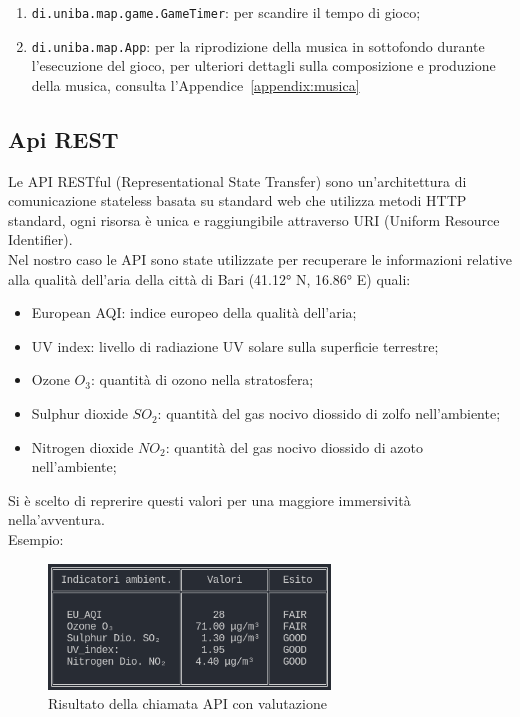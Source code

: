 \documentclass[italian,12pt,a4paper]{article}
\begin{document}
	\begin{enumerate}
		\item \texttt{di.uniba.map.game.GameTimer}: per scandire il tempo di gioco;
		\item \texttt{di.uniba.map.App}: per la riprodizione della musica in sottofondo durante l'esecuzione del gioco, per ulteriori dettagli sulla composizione e produzione della musica, consulta l'Appendice~\ref{appendix:musica}
	\end{enumerate}
	
	\subsection{Api REST}
	Le API RESTful (Representational State Transfer) sono un'architettura di comunicazione stateless basata su standard web che utilizza metodi HTTP standard, ogni risorsa è unica e raggiungibile attraverso URI  (Uniform Resource Identifier).\\
	Nel nostro caso le API sono state utilizzate per recuperare le informazioni relative alla qualità dell'aria della città di Bari (41.12° N, 16.86° E) quali:
	
		\begin{itemize}
			\item European AQI: indice europeo della qualità dell'aria; 
			\item UV index: livello di radiazione UV solare sulla superficie terrestre;
			\item Ozone $O_3$: quantità di ozono nella stratosfera;
			\item Sulphur dioxide $SO_2$: quantità del gas nocivo diossido di zolfo nell'ambiente;
			\item Nitrogen dioxide $NO_2$: quantità del gas nocivo diossido di azoto nell'ambiente;
			
		\end{itemize}
	Si è scelto di reprerire questi valori per una maggiore immersività nella'avventura.\\
	Esempio:
	\begin{figure}[!h]
		\centering
		\includegraphics[width=7.5cm]{screen_api}
		\caption{Risultato della chiamata API con valutazione}
		\label{fig:screenapi}
	\end{figure}
	
\end{document}
